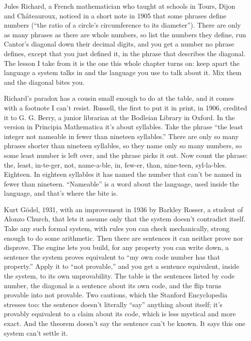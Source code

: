 \documentclass[11pt,twoside]{article}
\theoremstyle{thielethm}
\theoremstyle{thieledef}
\theoremstyle{thieledef}
\theoremstyle{thieledef}
\theoremstyle{thielethm}
\theoremstyle{thieleobs}
\theoremstyle{thielethm}
\begin{document}
Jules Richard, a French mathematician who taught at schools in Tours, Dijon and Châteauroux, noticed in a short note in 1905 that some phrases define numbers (``the ratio of a circle's circumference to its diameter''). There are only as many phrases as there are whole numbers, so list the numbers they define, run Cantor's diagonal down their decimal digits, and you get a number no phrase defines, except that you just defined it, in the phrase that describes the diagonal. The lesson I take from it is the one this whole chapter turns on: keep apart the language a system talks in and the language you use to talk about it. Mix them and the diagonal bites you.

Richard's paradox has a cousin small enough to do at the table, and it comes with a footnote I can't resist. Russell, the first to put it in print, in 1906, credited it to G. G. Berry, a junior librarian at the Bodleian Library in Oxford. In the version in Principia Mathematica it's about syllables. Take the phrase ``the least integer not nameable in fewer than nineteen syllables.'' There are only so many phrases shorter than nineteen syllables, so they name only so many numbers, so some least number is left over, and the phrase picks it out. Now count the phrase: the, least, in-te-ger, not, name-a-ble, in, few-er, than, nine-teen, syl-la-bles. Eighteen. In eighteen syllables it has named the number that can't be named in fewer than nineteen. ``Nameable'' is a word about the language, used inside the language, and that's where the bite is.

Kurt Gödel, 1931, with an improvement in 1936 by Barkley Rosser, a student of Alonzo Church, that lets it assume only that the system doesn't contradict itself. Take any such formal system, with rules you can check mechanically, strong enough to do some arithmetic. Then there are sentences it can neither prove nor disprove. The engine lets you build, for any property you can write down, a sentence the system proves equivalent to ``my own code number has that property.'' Apply it to ``not provable,'' and you get a sentence equivalent, inside the system, to its own unprovability. The table is the sentences listed by code number, the diagonal is a sentence about its own code, and the flip turns provable into not provable. Two cautions, which the Stanford Encyclopedia stresses too: the sentence doesn't literally ``say'' anything about itself; it's provably equivalent to a claim about its code, which is less mystical and more exact. And the theorem doesn't say the sentence can't be known. It says this one system can't settle it.
\end{document}
